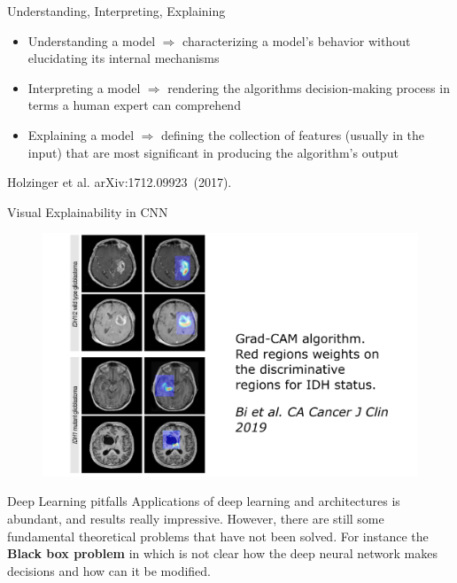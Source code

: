 \documentclass[11pt, aspectratio=43]{beamer}
\begin{document}
	\begin{frame}{Understanding, Interpreting, Explaining}
	\begin{itemize}
		\item Understanding a model $\Rightarrow$ characterizing a model’s behavior without  elucidating its internal mechanisms
		\item Interpreting a model $\Rightarrow$ rendering the algorithms decision-making process in terms a human expert can comprehend
		\item Explaining a model $\Rightarrow$ defining the collection of features (usually in the input) that are most significant in producing the algorithm’s output
		
	\end{itemize}
Holzinger et al. arXiv:1712.09923 (2017). 
	
\end{frame}

\begin{frame}{Visual Explainability in CNN}

	\begin{figure}[h]
	\centering
	\small{\includegraphics{Figures/explaincnn.png}}
\end{figure}	

\end{frame}
\begin{frame}{Deep Learning pitfalls}
	Applications of deep learning and architectures is abundant, and results really impressive. 
	However, there are still some fundamental theoretical problems that have not been solved.
	For instance the \textbf{Black box problem} in which is not clear how the deep neural network makes decisions and how can it be modified.  
\end{frame}
\end{document}
